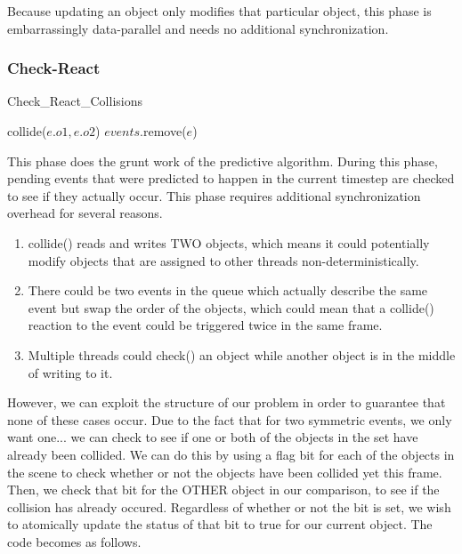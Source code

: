 \documentclass[conference]{IEEEtran}
\begin{document}
Because updating an object only modifies that particular object, this phase is embarrassingly data-parallel and needs no additional synchronization.

\subsubsection{Check-React}

\begin{algorithm}
\caption{Check\_React\_Collisions}
\begin{algorithmic}
\STATE {}
	\STATE {}
		\STATE {}
		\STATE collide($e.o1,e.o2$)
	\ENDIF
	\STATE {}
	\STATE $events$.remove($e$)
\ENDFOR
\end{algorithmic}
\end{algorithm}
This phase does the grunt work of the predictive algorithm.  During this phase, pending events that were predicted to happen in the current timestep are checked to see if they actually occur.  This phase requires additional synchronization overhead for several reasons.

\begin{enumerate}
	\item collide() reads and writes TWO objects, which means it could potentially modify objects that are assigned to other threads non-deterministically.
	\item There could be two events in the queue which actually describe the same event but swap the order of the objects, which could mean that a collide() reaction to the event could be triggered twice in the same frame.
	\item Multiple threads could check() an object while another object is in the middle of writing to it.
\end{enumerate}

However, we can exploit the structure of our problem in order to guarantee that none of these cases occur.  Due to the fact that for two symmetric events, we only want one... we can check to see if one or both of the objects in the set have already been collided.
We can do this by using a flag bit for each of the objects in the scene to check whether or not the objects have been collided yet this frame.  Then, we check
that bit for the OTHER object in our comparison, to see if the collision has already occured.  Regardless of whether or not the bit is set, we wish to atomically
update the status of that bit to true for our current object.  The code becomes as follows.
\end{document}
